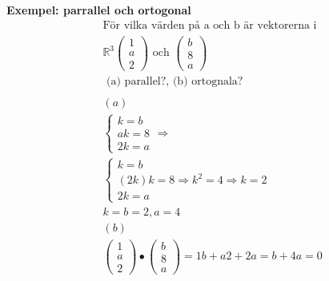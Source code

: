 \begin{multicols}{2}
\textbf{Exempel: parrallel och ortogonal}
\begin{align*}
  &\text{För vilka värden på a och b är vektorerna i } \\
  &\mathbb{R}^3
  \begin{pmatrix}  1 \\  a \\  2  \end{pmatrix} \text{ och }
  \begin{pmatrix}  b \\  8 \\  a  \end{pmatrix} \\
  &\text{ (a) parallel?, (b) ortognala?}  \\
  &\\
  &(a) \\
  &\left\{\begin{array}{r}
  k = b \\
  ak = 8 \\
  2k = a
  \end{array}\right.  \Rightarrow{} \\
  &\left\{\begin{array}{r}
  k = b \\
  (2k)k = 8  \Rightarrow{} k^2 = 4  \Rightarrow{} k = 2  \\ 
  2k = a
  \end{array}\right. \\
  & k=b=2, a=4 \\
  &(b) \\
  &\begin{pmatrix}  1 \\  a \\  2  \end{pmatrix} \bullet{}
  \begin{pmatrix}  b \\  8 \\  a  \end{pmatrix} = 1b+a2+2a = b+4a = 0 \\
\end{align*}



\end{multicols}
